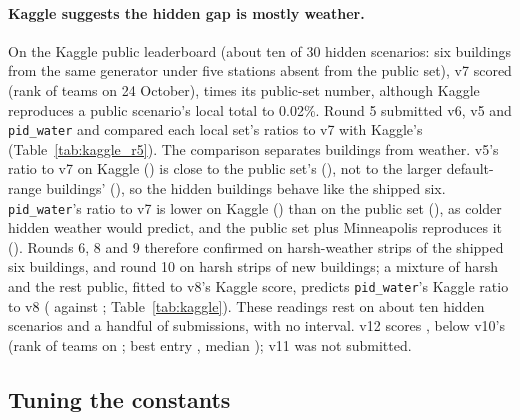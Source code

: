 \documentclass{article}
\begin{document}




\paragraph{Kaggle suggests the hidden gap is mostly weather.} On the Kaggle public leaderboard (about ten of 30 hidden scenarios: six buildings from the same generator under five stations absent from the public set), v7 scored \RFiveKagVSeven{} (rank \RFiveKagRankVSeven{} of \RFiveKagTeamsVSeven{} teams on 24 October), \RFiveKagGapPub{} times its public-set number, although Kaggle reproduces a public scenario's local total to 0.02\%. Round 5 submitted v6, v5 and \texttt{pid\_water} and compared each local set's ratios to v7 with Kaggle's (Table~\ref{tab:kaggle_r5}). The comparison separates buildings from weather. v5's ratio to v7 on Kaggle (\RFiveKagRatioVFive) is close to the public set's (\RFivePubRatioVFive), not to the larger default-range buildings' (\RFiveOldRatioVFive), so the hidden buildings behave like the shipped six. \texttt{pid\_water}'s ratio to v7 is lower on Kaggle (\RFiveKagRatioPid) than on the public set (\RFivePubRatioPid), as colder hidden weather would predict, and the public set plus Minneapolis reproduces it (\RFivePubMinnRatioPid). Rounds 6, 8 and 9 therefore confirmed on harsh-weather strips of the shipped six buildings, and round 10 on harsh strips of new buildings; a mixture of \RSixMixWPct{} harsh and the rest public, fitted to v8's Kaggle score, predicts \texttt{pid\_water}'s Kaggle ratio to v8 (\RSixMixPid{} against \RSixKagRatioPid; Table~\ref{tab:kaggle}). These readings rest on about ten hidden scenarios and a handful of submissions, with no interval. v12 scores \RTenKagVTwelve{}, \RElvKagVsTen{} below v10's \REigKagVTen{} (rank \RElvKagRank{} of \RElvKagTeams{} teams on \RElvKagDate{}; best entry \RElvKagBest{}, median \RElvKagMedian); v11 was not submitted.

\subsection{Tuning the constants}
\label{sec:tuning}
\end{document}
